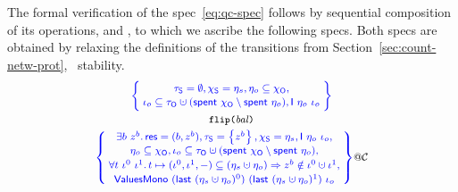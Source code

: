 The formal verification of the spec~\eqref{eq:qc-spec} follows by
sequential composition of its operations,  and
, to which we ascribe the following specs.
%
Both specs are obtained by relaxing the definitions of the transitions
from Section~\ref{sec:count-netw-prot}, \wrt~stability.
%
%
\[
%
{\small
\begin{array}{c}
  \spec{\!\!
  \begin{array}{c}
    \tkns = \emptyset,
    \hists = \gists,
    \gisto \subseteq \histo,\\[2pt]
    \ikno  \subseteq \tkno \hunion (\Tomb~\histo \setminus
    \Tomb~\gisto), 
     \Ic{\gisto}{\ikno}
  \end{array}
  \!\!}
  \\\\[-6pt]
  \texttt{flip(}\bal\texttt{)}
  \\[3pt]
  \spec{\!\!
  \begin{array}{c}
    \exists b~z^b \ldot \res = (b, z^b)\aand
    \tkns = \set{z^b}\aand \hists = \gists \aand
     \Ic{\gisto}{\ikno},
   \\[2pt]
    \gisto \subseteq \histo, \ikno \subseteq \tkno \hunion (\Tomb~\histo \setminus \Tomb~\gisto),\\[2pt]    
    \forall t~\ikn^0~\ikn^1 \ldot
    t \hpts (\ikn^0, \ikn^1, -) \subseteq (\gists \hunion \gisto) \Rightarrow z^b \notin \ikn^0 \hunion \ikn^1,
    \\[2pt]     
    \bapprox~(\last~(\gists \hunion \gisto)^0)~(\last~(\gists \hunion \gisto)^1)~\ikno 
  \end{array}
  \!\!}@\ccon
%
\end{array}
}
\]

